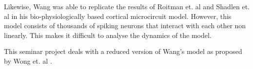 Likewise, Wang \cite{wang2002probabilistic} was able to replicate the results of Roitman et. al\cite{roitman2002response} and Shadlen et. al \cite{shadlen2001neural} in his bio-physiologically based cortical microcircuit model. However, this model consists of thousands of spiking neurons that interact with each other non linearly. This makes it difficult to analyse the dynamics of the model.

This seminar project deals with a reduced version of Wang's model as proposed by Wong et. al \cite{wong2006recurrent}.

